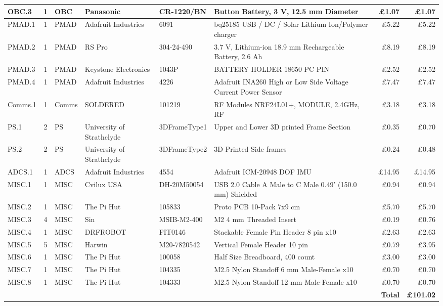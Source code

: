 \documentclass[a4paper,12pt,titlepage]{report}
\begin{document}
\begin{landscape}
\begin{table}[p]
{\begin{tabular}{|l|c|l|l|l|l|r|r|}
    OBC.3 & 1 & OBC & Panasonic & CR-1220/BN & Button Battery, 3 V, 12.5 mm Diameter & \pounds1.07 & \pounds1.07 \\ \hline
    PMAD.1 & 1 & PMAD & Adafruit Industries & 6091 & bq25185 USB / DC / Solar Lithium Ion/Polymer charger & \pounds5.22 & \pounds5.22 \\ \hline
    PMAD.2 & 1 & PMAD & RS Pro & 304-24-490 & 3.7 V, Lithium-ion 18.9 mm Rechargeable Battery, 2.6 Ah & \pounds8.19 & \pounds8.19 \\ \hline
    PMAD.3 & 1 & PMAD & Keystone Electronics & 1043P & BATTERY HOLDER 18650 PC PIN & \pounds2.52 & \pounds2.52 \\ \hline
    PMAD.4 & 1 & PMAD & Adafruit Industries & 4226 & Adafruit INA260 High or Low Side Voltage Current Power Sensor & \pounds7.47 & \pounds7.47 \\ \hline
    Comms.1 & 1 & Comms & SOLDERED & 101219 & RF Modules NRF24L01+, MODULE, 2.4GHz, RF & \pounds3.18 & \pounds3.18 \\ \hline
    PS.1 & 2 & PS & University of Strathclyde & 3DFrameType1 & Upper and Lower 3D printed Frame Section & \pounds0.35 & \pounds0.70 \\ \hline
    PS.2 & 2 & PS & University of Strathclyde & 3DFrameType2 & 3D Printed Side frames & \pounds0.24 & \pounds0.48 \\ \hline
    ADCS.1 & 1 & ADCS & Adafruit Industries & 4554 & Adafruit ICM-20948 DOF IMU & \pounds14.95 & \pounds14.95 \\ \hline
    MISC.1 & 1 & MISC & Cvilux USA & DH-20M50054 & USB 2.0 Cable A Male to C Male 0.49' (150.0 mm) Shielded & \pounds0.94 & \pounds0.94 \\ \hline
    MISC.2 & 1 & MISC & The Pi Hut & 105833 & Proto PCB 10-Pack 7x9 cm & \pounds5.70 & \pounds5.70 \\ \hline
    MISC.3 & 4 & MISC & Sin & MSIB-M2-400 & M2 4 mm Threaded Insert & \pounds0.19 & \pounds0.76 \\ \hline
    MISC.4 & 1 & MISC & DRFROBOT & FIT0146 & Stackable Female Pin Header 8 pin x10 & \pounds2.63 & \pounds2.63 \\ \hline
    MISC.5 & 5 & MISC & Harwin & M20-7820542 & Vertical Female Header 10 pin & \pounds0.79 & \pounds3.95 \\ \hline
    MISC.6 & 1 & MISC & The Pi Hut & 100058 & Half Size Breadboard, 400 count & \pounds3.00 & \pounds3.00 \\ \hline
    MISC.7 & 1 & MISC & The Pi Hut & 104335 & M2.5 Nylon Standoff 6 mm Male-Female x10 & \pounds0.70 & \pounds0.70 \\ \hline
    MISC.8 & 1 & MISC & The Pi Hut & 104333 & M2.5 Nylon Standoff 12 mm Male-Female x10 & \pounds0.70 & \pounds0.70 \\ \hline
    \multicolumn{7}{|r|}{\textbf{Total}} & \textbf{\pounds101.02} \\ \hline
    \end{tabular}%
    }
    \end{table}
\end{landscape}
\end{document}
